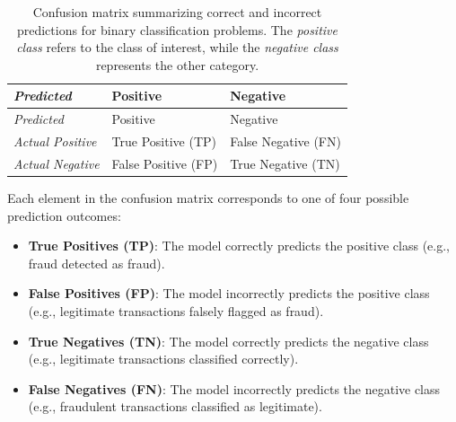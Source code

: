\documentclass[
  11pt,
]{book}
\providecommand{\tightlist}{%
  \setlength{\itemsep}{0pt}\setlength{\parskip}{0pt}}
\theoremstyle{definition}
\theoremstyle{definition}
\theoremstyle{definition}
\theoremstyle{definition}
\theoremstyle{remark}
\begin{document}
\begin{longtable}[]{@{}
  >{\raggedright\arraybackslash}p{}
  >{\raggedright\arraybackslash}p{}
  >{\raggedright\arraybackslash}p{}@{}}
\caption{\label{tab:confusion-matrix} Confusion matrix summarizing correct and incorrect predictions for binary classification problems. The \emph{positive class} refers to the class of interest, while the \emph{negative class} represents the other category.}\tabularnewline
\toprule\noalign{}
\begin{minipage}[b]{\linewidth}\raggedright
\emph{Predicted}
\end{minipage} & \begin{minipage}[b]{\linewidth}\raggedright
Positive
\end{minipage} & \begin{minipage}[b]{\linewidth}\raggedright
Negative
\end{minipage} \\
\midrule\noalign{}
\endfirsthead
\toprule\noalign{}
\begin{minipage}[b]{\linewidth}\raggedright
\emph{Predicted}
\end{minipage} & \begin{minipage}[b]{\linewidth}\raggedright
Positive
\end{minipage} & \begin{minipage}[b]{\linewidth}\raggedright
Negative
\end{minipage} \\
\midrule\noalign{}
\endhead
\bottomrule\noalign{}
\endlastfoot
\emph{Actual Positive} & { True Positive (TP) } & { False Negative (FN) } \\
\emph{Actual Negative} & { False Positive (FP) } & { True Negative (TN) } \\
\end{longtable}

Each element in the confusion matrix corresponds to one of four possible prediction outcomes:

\begin{itemize}
\tightlist
\item
  \textbf{True Positives (TP)}: The model correctly predicts the positive class (e.g., fraud detected as fraud).\\
\item
  \textbf{False Positives (FP)}: The model incorrectly predicts the positive class (e.g., legitimate transactions falsely flagged as fraud).\\
\item
  \textbf{True Negatives (TN)}: The model correctly predicts the negative class (e.g., legitimate transactions classified correctly).\\
\item
  \textbf{False Negatives (FN)}: The model incorrectly predicts the negative class (e.g., fraudulent transactions classified as legitimate).
\end{itemize}
\end{document}
